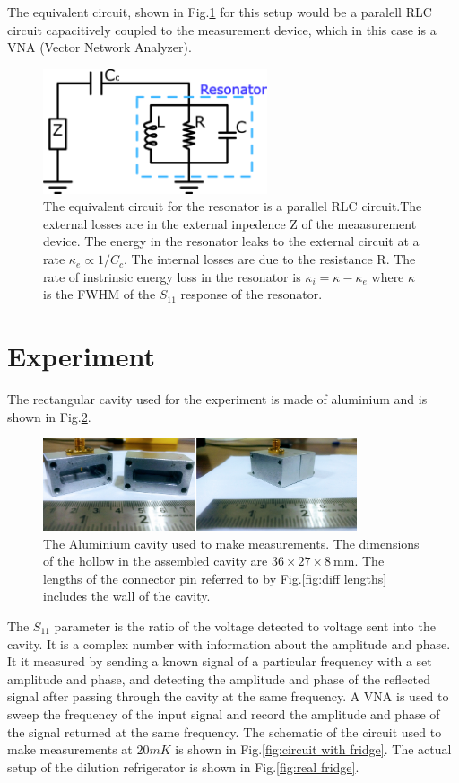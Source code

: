 The equivalent circuit, shown in Fig.\ref{fig:external circuit} for this setup would be a paralell RLC circuit capacitively coupled to the measurement device, which in this case is a VNA (Vector Network Analyzer).

\begin{figure}
\centering
\includegraphics[width=250px]{Figures/external.png}
\decoRule
\caption[External coupling circuit]{The equivalent circuit for the resonator is a parallel RLC circuit.The external losses are in the external inpedence Z of the meaasurement device. The energy in the resonator leaks to the external circuit at a rate $\kappa_e\propto 1/C_c$. The internal losses are due to the resistance R. The rate of instrinsic energy loss in the resonator is $\kappa_i = \kappa - \kappa_e$ where $\kappa$ is the FWHM of the $S_{11}$ response of the resonator.}
\label{fig:external circuit}
\end{figure}

\section{Experiment}

The rectangular cavity used for the experiment is made of aluminium and is shown in Fig.\ref{fig:cavity}.

\begin{figure}
\centering
\includegraphics[width=350px]{Figures/cavity.png}
\decoRule
\caption[Aluminium Cavity]{The Aluminium cavity used to make measurements. The dimensions of the hollow in the assembled cavity are $36\times 27\times 8\SI{}{\milli\meter}$. The lengths of the connector pin referred to by Fig.\ref{fig:diff lengths} includes the wall of the cavity.}
\label{fig:cavity}
\end{figure}

The $S_{11}$ parameter is the ratio of the voltage detected to voltage sent into the cavity. It is a complex number with information about the amplitude and phase. It it measured by sending a known signal of a particular frequency with a set amplitude and phase, and detecting the amplitude and phase of the reflected signal after passing through the cavity at the same frequency. A VNA is used to sweep the frequency of the input signal and record the amplitude and phase of the signal returned at the same frequency. The schematic of the circuit used to make measurements at $20mK$ is shown in Fig.\ref{fig:circuit with fridge}. The actual setup of the dilution refrigerator is shown in Fig.\ref{fig:real fridge}.

